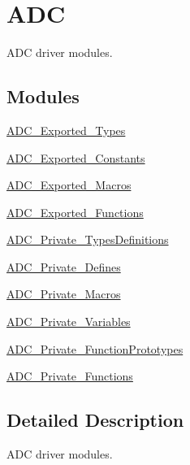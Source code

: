 \hypertarget{group___a_d_c}{}\section{A\+DC}
\label{group___a_d_c}


A\+DC driver modules.  


\subsection*{Modules}
\begin{DoxyCompactItemize}
\item 
\mbox{\hyperlink{group___a_d_c___exported___types}{A\+D\+C\+\_\+\+Exported\+\_\+\+Types}}
\item 
\mbox{\hyperlink{group___a_d_c___exported___constants}{A\+D\+C\+\_\+\+Exported\+\_\+\+Constants}}
\item 
\mbox{\hyperlink{group___a_d_c___exported___macros}{A\+D\+C\+\_\+\+Exported\+\_\+\+Macros}}
\item 
\mbox{\hyperlink{group___a_d_c___exported___functions}{A\+D\+C\+\_\+\+Exported\+\_\+\+Functions}}
\item 
\mbox{\hyperlink{group___a_d_c___private___types_definitions}{A\+D\+C\+\_\+\+Private\+\_\+\+Types\+Definitions}}
\item 
\mbox{\hyperlink{group___a_d_c___private___defines}{A\+D\+C\+\_\+\+Private\+\_\+\+Defines}}
\item 
\mbox{\hyperlink{group___a_d_c___private___macros}{A\+D\+C\+\_\+\+Private\+\_\+\+Macros}}
\item 
\mbox{\hyperlink{group___a_d_c___private___variables}{A\+D\+C\+\_\+\+Private\+\_\+\+Variables}}
\item 
\mbox{\hyperlink{group___a_d_c___private___function_prototypes}{A\+D\+C\+\_\+\+Private\+\_\+\+Function\+Prototypes}}
\item 
\mbox{\hyperlink{group___a_d_c___private___functions}{A\+D\+C\+\_\+\+Private\+\_\+\+Functions}}
\end{DoxyCompactItemize}


\subsection{Detailed Description}
A\+DC driver modules. 

